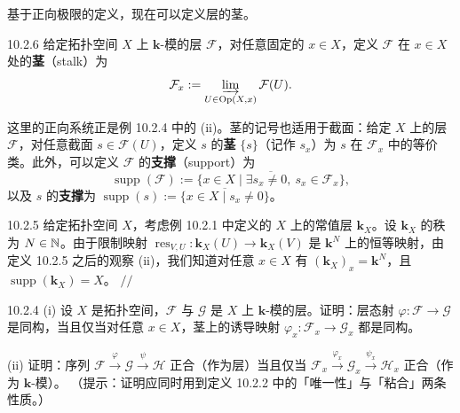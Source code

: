 基于正向极限的定义，现在可以定义层的茎。

\begin{wdefn}{10.2.6}
  给定拓扑空间 $X$ 上 $\mathbf{k}$-模的层 $\mathcal{F}$，对任意固定的
  $x\in X$，定义 $\mathcal{F}$ 在 $x\in X$ 处的\textbf{茎}（stalk）为
  \[
    \mathcal{F}_x:=\varinjlim_{U\in\operatorname{Op}(X,x)}\mathcal{F}(U).
  \]
\end{wdefn}


这里的正向系统正是例 10.2.4 中的 (ii)。茎的记号也适用于截面：给定 $X$ 上的层
$\mathcal{F}$，对任意截面 $s\in\mathcal{F}(U)$，定义 $s$ 的\textbf{茎}
$\{s\}$（记作 $s_x$）为 $s$ 在 $\mathcal{F}_x$ 中的等价类。此外，可以定义
$\mathcal{F}$ 的\textbf{支撑}（support）为
\[
  \operatorname{supp}(\mathcal{F})
  :=\overline{\{x\in X\mid\exists s_x\ne0,\ s_x\in\mathcal{F}_x\}},
\]
以及 $s$ 的\textbf{支撑}为
$\operatorname{supp}(s):=\overline{\{x\in X\mid s_x\ne0\}}$。


\begin{wexam}{10.2.5}
  给定拓扑空间 $X$，考虑例 10.2.1 中定义的 $X$ 上的常值层 $\mathbf{k}_X$。设
  $\mathbf{k}_X$ 的秩为 $N\in\mathbb{N}$。由于限制映射
  $\operatorname{res}_{V,U}\colon\mathbf{k}_X(U)\to\mathbf{k}_X(V)$ 是
  $\mathbf{k}^N$ 上的恒等映射，由定义 10.2.5 之后的观察 (ii)，我们知道对任意
  $x\in X$ 有 $(\mathbf{k}_X)_x=\mathbf{k}^N$，且
  $\operatorname{supp}(\mathbf{k}_X)=X$。
  \hfill$//$
\end{wexam}

\begin{wexer}{10.2.4}
  (i) 设 $X$ 是拓扑空间，$\mathcal{F}$ 与 $\mathcal{G}$ 是 $X$ 上
  $\mathbf{k}$-模的层。证明：层态射 $\varphi\colon\mathcal{F}\to\mathcal{G}$
  是同构，当且仅当对任意 $x\in X$，茎上的诱导映射
  $\varphi_x\colon\mathcal{F}_x\to\mathcal{G}_x$ 都是同构。

  (ii) 证明：序列 $\mathcal{F}\xrightarrow{\varphi}\mathcal{G}
  \xrightarrow{\psi}\mathcal{H}$ 正合（作为层）当且仅当
  $\mathcal{F}_x\xrightarrow{\varphi_x}\mathcal{G}_x
  \xrightarrow{\psi_x}\mathcal{H}_x$ 正合（作为 $\mathbf{k}$-模）。
  （提示：证明应同时用到定义 10.2.2 中的「唯一性」与「粘合」两条性质。）
\end{wexer}

